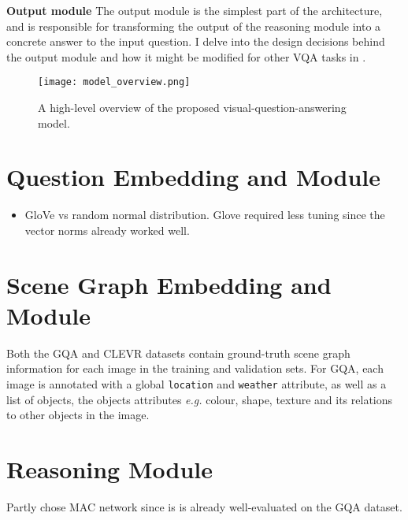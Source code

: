 \textbf{Output module}
The output module is the simplest part of the architecture, and is responsible for transforming the output of the reasoning module into a concrete answer to the input question. I delve into the design decisions behind the output module and how it might be modified for other VQA tasks in \sectionautorefname{ \ref{section:output_module}}.

\begin{figure}[htbp]
    \centering
    \texttt{[image: model\_overview.png]}
    \caption{A high-level overview of the proposed visual-question-answering model.}
    \label{fig:model_overview}
\end{figure}

\section{Question Embedding and Module}
\label{section:question_input_module}
\begin{itemize}
    \item GloVe vs random normal distribution. Glove required less tuning since the vector norms already worked well.
\end{itemize}

\section{Scene Graph Embedding and Module}
\label{section:scene_graph_input_module}

 Both the GQA and CLEVR datasets contain ground-truth scene graph information for each image in the training and validation sets. For GQA, each image is annotated with a global \texttt{location} and \texttt{weather} attribute,  as well as a list of objects, the objects attributes \textit{e.g.} colour, shape, texture and its relations to other objects in the image.

\section{Reasoning Module}
\label{section:reasoning_module}

{\color{red}Partly chose MAC network since is is already well-evaluated on the GQA dataset.}

